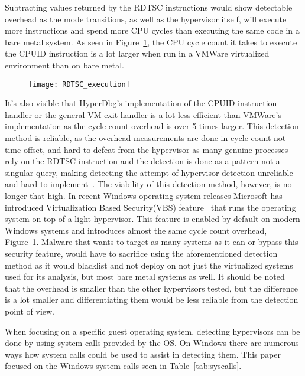 Subtracting values returned by the RDTSC instructions would show detectable overhead as the mode transitions, as well as the hypervisor itself, will execute more instructions and spend more CPU cycles than executing the same code in a bare metal system. 
As seen in Figure~\ref{fig:rdtsc_overhead}, the CPU cycle count it takes to execute the CPUID instruction is a lot larger when run in a VMWare virtualized environment than on bare metal. 
\begin{figure}[tbh]
    \texttt{[image: RDTSC\_execution]} %
    \label{fig:rdtsc_overhead}
\end{figure}

It's also visible that HyperDbg's implementation of the CPUID instruction handler or the general VM-exit handler is a lot less efficient than VMWare's implementation as the cycle count overhead is over 5 times larger. 
This detection method is reliable, as the overhead measurements are done in cycle count not time offset, and hard to defeat from the hypervisor as many genuine processes rely on the RDTSC 
instruction and the detection is done as a pattern not a singular query, making detecting the attempt of hypervisor detection unreliable and hard to implement~\cite{hypervisor-detection-timing-attacks}. 
The viability of this detection method, however, is no longer that high. In recent Windows operating system releases Microsoft has introduced Virtualization Based Security(VBS) feature~\cite{windows-vbs} 
that runs the operating system on top of a light hypervisor. This feature is enabled by default on modern Windows systems and introduces almost the same cycle count overhead, Figure~\ref{fig:rdtsc_overhead}. 
Malware that wants to target as many systems as it can or bypass this security feature, would have to sacrifice using the aforementioned detection method as it would blacklist and not deploy on not just the virtualized systems used for its analysis, 
but most bare metal systems as well. It should be noted that the overhead is smaller than the other hypervisors tested, but the difference is a lot smaller and differentiating them would be less reliable from the detection point of view. 

When focusing on a specific guest operating system, detecting hypervisors can be done by using system calls provided by the OS. 
On Windows there are numerous ways how system calls could be used to assist in detecting them. This paper focused on the Windows system calls seen in Table~\ref{tab:syscalls}. 


